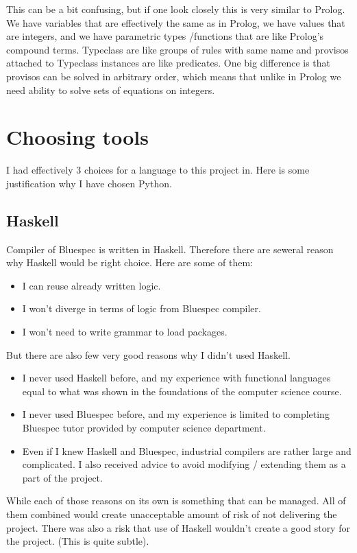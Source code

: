 \documentclass[14pt]{report}
\begin{document}
This can be a bit confusing, but if one look closely this is very similar to Prolog. We have variables that are effectively the same as in Prolog, we have values that are integers, and we have parametric types /functions that are like Prolog's compound terms. Typeclass are like groups of rules with same name and provisos attached to Typeclass instances are like predicates.
One big difference is that provisos can be solved in arbitrary order, which means that unlike in Prolog we need ability to solve sets of equations on integers.


\section{Choosing tools}
I had effectively 3 choices for a language to this project in. Here is some justification why I have chosen Python. 
\subsection{Haskell}
Compiler of Bluespec is written in Haskell. Therefore there are seweral reason why Haskell would be right choice. Here are some of them:
\begin{itemize}
    \item I can reuse already written logic.
    \item I won't diverge in terms of logic from Bluespec compiler.
    \item I won't need to write grammar to load packages.
\end{itemize}
But there are also few very good reasons why I didn't used Haskell.
\begin{itemize}
    \item I never used Haskell before, and my experience with functional languages equal to what was shown in the foundations of the computer science course.
    \item I never used Bluespec before, and my experience is limited to completing Bluespec tutor provided by computer science department.
    \item Even if I knew Haskell and Bluespec, industrial compilers are rather large and complicated. I also received advice to avoid modifying / extending them as a part of the project.
\end{itemize}
While each of those reasons on its own is something that can be managed. All of them combined would create unacceptable amount of risk of not delivering the project. There was also a risk that use of Haskell wouldn't create a good story for the project. (This is quite subtle).
\end{document}
